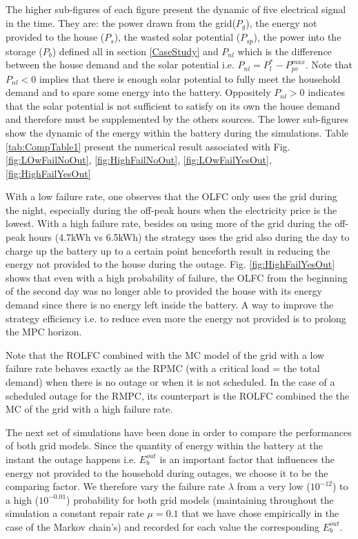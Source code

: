 \documentclass[conference]{IEEEtran}
\begin{document}
  The higher sub-figures of each figure present the dynamic of  five electrical signal in the time. They are: the power drawn from the grid($P_g$), the energy not provided to the house ($P_s$), the wasted solar potential ($P_{sp}$), the power into the storage ($P_b$) defined all in section \ref{CaseStudy} and $P_{nl}$ which is the difference between the house demand and the solar potential i.e. $P_{nl} = P_l^* - P_{pv}^{max}$. Note that $P_{nl} < 0$ implies that there is enough solar potential to fully meet the household demand and to spare some energy into the battery. Oppositely $P_{nl} > 0$  indicates that the solar potential is not sufficient to satisfy on its own the house demand and therefore must be supplemented by the others sources. The lower sub-figures show the dynamic of the energy within the battery during the simulations. Table \ref{tab:CompTable1} present the numerical result associated with Fig. \ref{fig:LOwFailNoOut}, \ref{fig:HighFailNoOut}, \ref{fig:LOwFailYesOut}, \ref{fig:HighFailYesOut}
  
  With a low failure rate, one observes that the OLFC only uses the grid during the night, especially during the off-peak hours when the electricity price is the lowest. With a high failure rate, besides on using  more of the grid during the off-peak hours (4.7kWh vs 6.5kWh) the strategy uses the grid also during the day to charge up the battery up to a certain point henceforth result in reducing the energy not provided to the house during the outage. Fig. \ref{fig:HighFailYesOut} shows that even with a high probability of failure, the OLFC from the beginning of the second day was no longer able to provided the house with its energy demand since there is no energy left inside the battery. A way to improve the strategy efficiency i.e. to reduce even more the energy not provided is to prolong the MPC horizon.
  
  Note that the ROLFC combined with the MC model of the grid with a low failure rate behaves exactly as the RPMC (with a critical load = the total demand) when there is no outage or when it is not scheduled. In the case of a scheduled outage for the RMPC, its counterpart is the ROLFC combined the the MC of the grid with a high failure rate. 
  
  The next set of simulations have been done in order to compare the performances of both grid models. Since the quantity of energy within the battery at the instant the outage happens i.e. $E_b^{out}$ is an important factor that influences the energy not provided to the household during outages, we choose it to be the comparing factor. We therefore vary the failure rate $\lambda$ from a very low ($10^{-12}$) to a high ($10^{-0.01}$) probability for both grid models (maintaining throughout the simulation a constant repair rate $\mu=0.1$ that we have chose empirically in the case of the Markov chain's) and recorded for each value the corresponding $E_b^{out}$.
  
\end{document}
